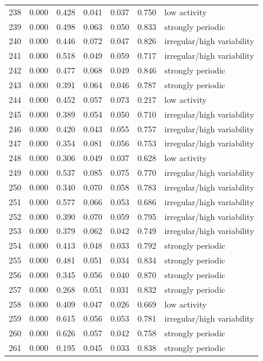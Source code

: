 \begin{longtable}{lrrrrrl}
238 & 0.000 & 0.428 & 0.041 & 0.037 & 0.750 & low activity \\
239 & 0.000 & 0.498 & 0.063 & 0.050 & 0.833 & strongly periodic \\
240 & 0.000 & 0.446 & 0.072 & 0.047 & 0.826 & irregular/high variability \\
241 & 0.000 & 0.518 & 0.049 & 0.059 & 0.717 & irregular/high variability \\
242 & 0.000 & 0.477 & 0.068 & 0.049 & 0.846 & strongly periodic \\
243 & 0.000 & 0.391 & 0.064 & 0.046 & 0.787 & strongly periodic \\
244 & 0.000 & 0.452 & 0.057 & 0.073 & 0.217 & low activity \\
245 & 0.000 & 0.389 & 0.054 & 0.050 & 0.710 & irregular/high variability \\
246 & 0.000 & 0.420 & 0.043 & 0.055 & 0.757 & irregular/high variability \\
247 & 0.000 & 0.354 & 0.081 & 0.056 & 0.753 & irregular/high variability \\
248 & 0.000 & 0.306 & 0.049 & 0.037 & 0.628 & low activity \\
249 & 0.000 & 0.537 & 0.085 & 0.075 & 0.770 & irregular/high variability \\
250 & 0.000 & 0.340 & 0.070 & 0.058 & 0.783 & irregular/high variability \\
251 & 0.000 & 0.577 & 0.066 & 0.053 & 0.686 & irregular/high variability \\
252 & 0.000 & 0.390 & 0.070 & 0.059 & 0.795 & irregular/high variability \\
253 & 0.000 & 0.379 & 0.062 & 0.042 & 0.749 & irregular/high variability \\
254 & 0.000 & 0.413 & 0.048 & 0.033 & 0.792 & strongly periodic \\
255 & 0.000 & 0.481 & 0.051 & 0.034 & 0.834 & strongly periodic \\
256 & 0.000 & 0.345 & 0.056 & 0.040 & 0.870 & strongly periodic \\
257 & 0.000 & 0.268 & 0.051 & 0.031 & 0.832 & strongly periodic \\
258 & 0.000 & 0.409 & 0.047 & 0.026 & 0.669 & low activity \\
259 & 0.000 & 0.615 & 0.056 & 0.053 & 0.781 & irregular/high variability \\
260 & 0.000 & 0.626 & 0.057 & 0.042 & 0.758 & strongly periodic \\
261 & 0.000 & 0.195 & 0.045 & 0.033 & 0.838 & strongly periodic \\

\end{longtable}
